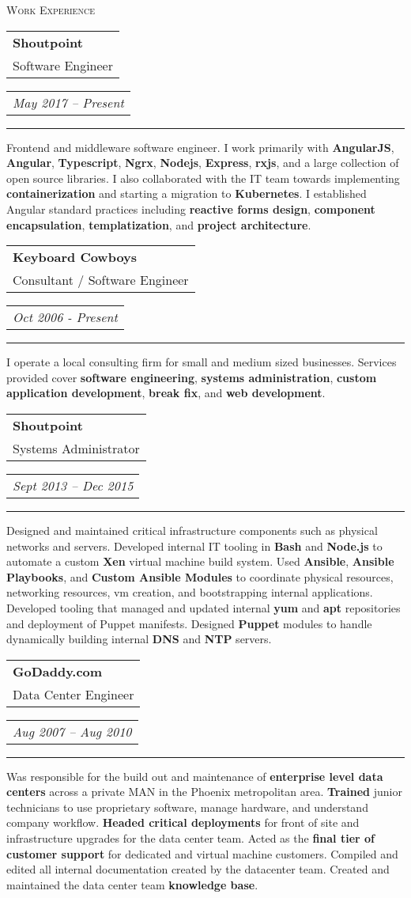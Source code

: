 \documentclass{article}
\makeatletter
\newcommand{\split}[3]{
\noindent\begin{tabular}[t]{@{}l}
    \textbf{#1} \\ #2
\end{tabular}
\hfill
\begin{tabular}[t]{l@{}}
    \\
    \textit{#3}
\end{tabular}
\noindent\rule{\columnwidth}{0.5pt}
}
\newcommand{\sub}[1]{
    {\raggedleft
        \large{\textsc{\color{OliveGreen}#1}}\par
    }
}
\makeatother
\begin{document}
\begin{multicols}{2}

\sub{Work Experience}

\split{Shoutpoint}{Software Engineer}{May 2017 -- Present}
Frontend and middleware software engineer. I work primarily with \textbf{AngularJS}, \textbf{Angular}, \textbf{Typescript}, \textbf{Ngrx}, \textbf{Nodejs}, \textbf{Express}, \textbf{rxjs}, and a large collection of open source libraries. I also collaborated with the IT team towards implementing \textbf{containerization} and starting a migration to \textbf{Kubernetes}. I established Angular standard practices including \textbf{reactive forms design}, \textbf{component encapsulation}, \textbf{templatization}, and \textbf{project architecture}.

\split{Keyboard Cowboys}{Consultant / Software Engineer}{Oct 2006 - Present}
I operate a local consulting firm for small and medium sized businesses. Services provided cover \textbf{software engineering}, \textbf{systems administration}, \textbf{custom application development}, \textbf{break fix}, and \textbf{web development}.

\split{Shoutpoint}{Systems Administrator}{Sept 2013 -- Dec 2015}
Designed and maintained critical infrastructure components such as physical networks and servers. Developed internal IT tooling in \textbf{Bash} and \textbf{Node.js} to automate a custom \textbf{Xen} virtual machine build system. Used \textbf{Ansible}, \textbf{Ansible Playbooks}, and \textbf{Custom Ansible Modules} to coordinate physical resources, networking resources, vm creation, and bootstrapping internal applications. Developed tooling that managed and updated internal \textbf{yum} and \textbf{apt} repositories and deployment of Puppet manifests. Designed \textbf{Puppet} modules to handle dynamically building internal \textbf{DNS} and \textbf{NTP} servers.

\split{GoDaddy.com}{Data Center Engineer}{Aug 2007 -- Aug 2010}
Was responsible for the build out and maintenance of \textbf{enterprise level data centers} across a private MAN in the Phoenix metropolitan area. \textbf{Trained} junior technicians to use proprietary software, manage hardware, and understand company workflow. \textbf{Headed critical deployments} for front of site and infrastructure upgrades for the data center team. Acted as the \textbf{final tier of customer support} for dedicated and virtual machine customers. Compiled and edited all internal documentation created by the datacenter team. Created and maintained the data center team \textbf{knowledge base}.


\end{multicols}
\end{document}
